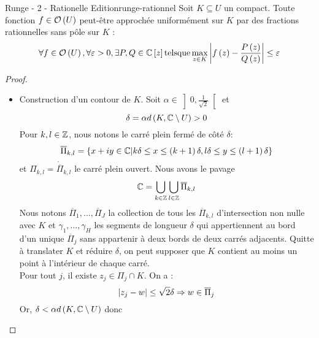 \documentclass{cours}
\begin{document}
\begin{théorème}{Runge - 2 - Rationelle Edition}{runge-rationnel}
    Soit $K \subseteq U$ un compact. Toute fonction $f \in \mathcal{O}\left(U\right)$ peut-être approchée uniformément sur $K$ par des fractions rationnelles sans pôle sur $K$ : 
    \begin{equation*}
        \forall f \in \mathcal{O}\left(U\right), \forall \varepsilon > 0, \exists P, Q \in \mathbb{C}\left[z\right] \mathrm{ tels que } \max_{z \in K}\left|f\left(z\right) - \frac{P\left(z\right)}{Q\left(z\right)}\right| \leq \varepsilon
    \end{equation*}
\end{théorème}
\begin{proof}
    \begin{itemize}
        \item Construction d'un contour de $K$. Soit $\alpha \in \left]0, \frac{1}{\sqrt{2}}\right[$ et 
        \begin{equation*}
            \delta = \alpha d\left(K, \mathbb{C} \setminus U\right) > 0
        \end{equation*}
        Pour $k, l \in \mathbb{Z}$, nous notons le carré plein fermé de côté $\delta$: 
        \begin{equation*}
            \overline{\Pi}_{k, l} = \left\{x + iy \in \mathbb{C} \middle| k \delta \leq x \leq \left(k + 1\right)\delta, l\delta \leq y \leq \left(l + 1\right)\delta\right\}
        \end{equation*}
        et $\Pi_{k, l} = \mathring{\overline{\Pi}}_{k, l}$ le carré plein ouvert. Nous avons le pavage
        \begin{equation*}
            \mathbb{C} = \bigcup_{k \in \mathbb{Z}} \bigcup_{l \in \mathbb{Z}} \overline{\Pi}_{k, l}
        \end{equation*}
        Nous notons $\overline{\Pi}_{1}, \ldots, \overline{\Pi}_{J}$ la collection de tous les $\overline{\Pi}_{k, l}$ d'intersection non nulle avec $K$ et $\gamma_{1}, \ldots, \gamma_{H}$ les segments de longueur $\delta$ qui appertiennent au bord d'un unique $\overline{\Pi}_{j}$ sans appartenir à deux bords de deux carrés adjacents. Quitte à translater $K$ et réduire $\delta$, on peut supposer que $K$ contient au moins un point à l'intérieur de chaque carré. \\
        Pour tout $j$, il existe $z_{j} \in \Pi_{j} \cap K$. On a : 
        \begin{equation*}
            \left|z_{j} - w\right| \leq \sqrt{2}\delta \Rightarrow w \in \overline{\Pi}_{j}
        \end{equation*}
        Or, $\delta < \alpha d\left(K, \mathbb{C} \setminus U\right)$ donc 

\end{itemize}
\end{proof}
\end{document}
